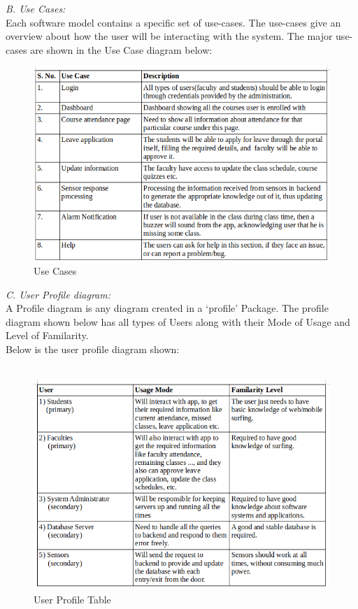 \documentclass[conference]{IEEEtran}
\begin{document}
\emph {B. Use Cases:}\\
Each software model contains a specific set of use-cases. The use-cases give an overview about how the user will be interacting with the system. The major use-cases are shown in the Use Case diagram below:

\begin{figure}[htbp]
\centerline{\includegraphics[scale=0.4]{Usecase.png}}
\caption{Use Cases}
\label{fig}
\end{figure}

\emph {C. User Profile diagram:}\\
A Profile diagram is any diagram created in a `profile' Package. The profile diagram shown below has all types of Users along with their Mode of Usage and Level of Familarity.\\
Below is the user profile diagram shown:\\ \\

\begin{figure}[htbp]
\centerline{\includegraphics[scale=0.4]{Userprofile.png}}
\caption{User Profile Table}
\label{fig}
\end{figure}
\end{document}
